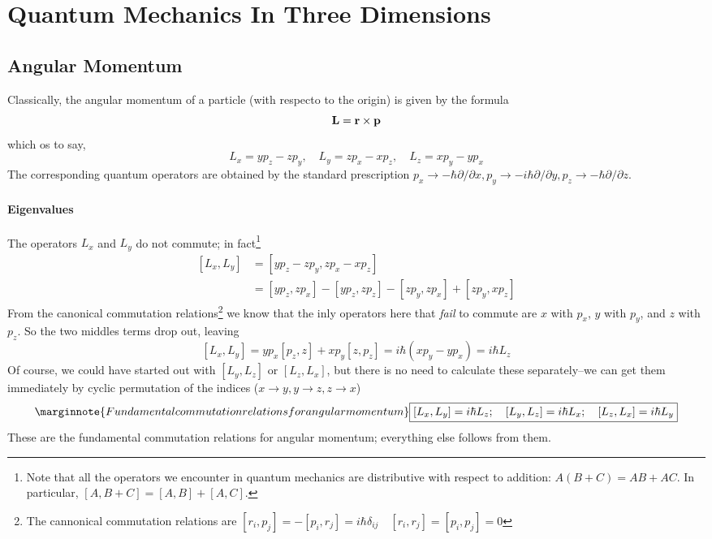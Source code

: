 \chapter{Quantum Mechanics In Three Dimensions}


\section{Angular Momentum}
Classically, the angular momentum of a particle (with respecto to the origin) is given by the formula
\begin{equation}\label{4.95}
	\vb{L}=\vb{r}\times\vb{p}
\end{equation}
which os to say,
\begin{equation}\label{4.96}
	L_x=yp_z-zp_y,\quad L_y=zp_x-xp_z,\quad L_z=xp_y-yp_x
\end{equation}
The corresponding quantum operators are obtained by the standard prescription $p_x\to -\hbar\partial/\partial x, p_y\to -i\hbar\partial/\partial y, p_z\to -\hbar\partial/\partial z$.

\subsubsection{Eigenvalues}
The operators $L_x$ and $L_y$ do not commute; in fact\footnote{Note that all the operators we encounter in quantum mechanics are distributive with respect to addition: $A(B+C)=AB +AC$. In particular, $[A,B+C]=[A,B]+[A,C]$.}
\begin{align}
	\nonumber [L_x,L_y]&=[yp_z-zp_y, zp_x-xp_z]\\
										 &=[yp_z,zp_x]-[yp_z,zp_z]-[zp_y,zp_x]+[zp_y,xp_z]\label{4.97}
\end{align}
From the canonical commutation relations\footnote{The cannonical commutation relations are $[r_i,p_j]=-[p_i,r_j]=i\hbar\delta_{ij}\quad [r_i,r_j]=[p_i,p_j]=0$} we know that the inly operators here that \textit{fail} to commute are $x$ with $p_x$, $y$ with $p_y$, and $z$ with $p_z$. So the two middles terms drop out, leaving
\begin{equation}\label{4.98}
	[L_x,L_y]=yp_x[p_z,z]+xp_y[z,p_z]=i\hbar(xp_y-yp_x)=i\hbar L_z
\end{equation}
Of course, we could have started out with $[L_y,L_z]$ or $[L_z,L_x]$, but there is no need to calculate these separately--we can get them immediately by cyclic permutation of the indices ($x\to y, y\to z, z\to x$)
\begin{equation}\label{4.99}\marginnote{Fundamental commutation relations for angular momentum}
	\boxed{[L_x,L_y]=i\hbar L_z;\quad [L_y,L_z]=i\hbar L_x;\quad [L_z,L_x]=i\hbar L_y}
\end{equation}
These are the fundamental commutation relations for angular momentum; everything else follows from them.

